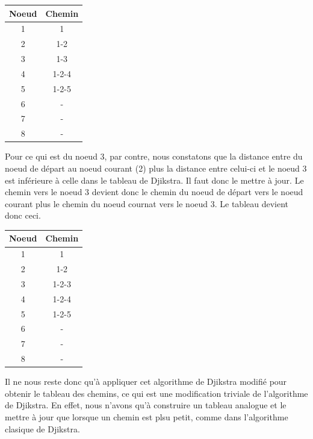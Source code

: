 \documentclass[12pt]{article}
\begin{document}
\begin{center}
	\begin{tabular}{||c c||}
		\hline
		Noeud & Chemin \\ [0.5ex]
		\hline\hline
		1 & 1 \\
		\hline
		2 & 1-2 \\
		\hline
		3 & 1-3 \\
		\hline
		4 & 1-2-4 \\
		\hline
		5 & 1-2-5  \\
		\hline
		6 & -  \\
		\hline
		7 & -  \\
		\hline
		8 & -  \\ [1ex]
		\hline
	\end{tabular}
\end{center}

Pour ce qui est du noeud 3, par contre, nous constatons que la distance entre du noeud de départ au noeud courant (2) plus la distance entre celui-ci et le noeud 3 est inférieure à celle dans le tableau de Djikstra. Il faut donc le mettre à jour. Le chemin vers le noeud 3 devient donc le chemin du noeud de départ vers le noeud courant plus le chemin du noeud cournat vers le noeud 3. Le tableau devient donc ceci.

\begin{center}
	\begin{tabular}{||c c||}
		\hline
		Noeud & Chemin \\ [0.5ex]
		\hline\hline
		1 & 1 \\
		\hline
		2 & 1-2 \\
		\hline
		3 & 1-2-3 \\
		\hline
		4 & 1-2-4 \\
		\hline
		5 & 1-2-5  \\
		\hline
		6 & -  \\
		\hline
		7 & -  \\
		\hline
		8 & -  \\ [1ex]
		\hline
	\end{tabular}
\end{center}

Il ne nous reste donc qu'à appliquer cet algorithme de Djikstra modifié pour obtenir le tableau des chemins, ce qui est une modification triviale de l'algorithme de Djikstra. En effet, nous n'avons qu'à construire un tableau analogue et le mettre à jour que lorsque un chemin est plsu petit, comme dans l'algorithme clasique de Djikstra.

\newpage
\end{document}

